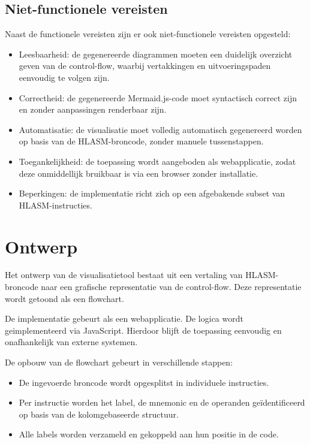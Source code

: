 \subsection{Niet-functionele vereisten}

Naast de functionele vereisten zijn er ook niet-functionele vereisten opgesteld:

\begin{itemize}
    \item Leesbaarheid: de gegenereerde diagrammen moeten een duidelijk overzicht geven van de control-flow, waarbij vertakkingen en uitvoeringspaden eenvoudig te volgen zijn.
    
    \item Correctheid: de gegenereerde Mermaid.js-code moet syntactisch correct zijn en zonder aanpassingen renderbaar zijn.
    
    \item Automatisatie: de visualisatie moet volledig automatisch gegenereerd worden op basis van de HLASM-broncode, zonder manuele tussenstappen.
    
    \item Toegankelijkheid: de toepassing wordt aangeboden als webapplicatie, zodat deze onmiddellijk bruikbaar is via een browser zonder installatie.
    
    \item Beperkingen: de implementatie richt zich op een afgebakende subset van HLASM-instructies. 
    
\end{itemize}


\section{Ontwerp}

Het ontwerp van de visualisatietool bestaat uit een vertaling van HLASM-broncode naar een grafische representatie van de control-flow. Deze representatie wordt getoond als een flowchart.

De implementatie gebeurt als een webapplicatie. De logica wordt geimplementeerd via JavaScript. Hierdoor blijft de toepassing eenvoudig en onafhankelijk van externe systemen.

De opbouw van de flowchart gebeurt in verschillende stappen:

\begin{itemize}
    \item De ingevoerde broncode wordt opgesplitst in individuele instructies.
    \item Per instructie worden het label, de mnemonic en de operanden geïdentificeerd op basis van de kolomgebaseerde structuur.
    \item Alle labels worden verzameld en gekoppeld aan hun positie in de code.
\end{itemize}

